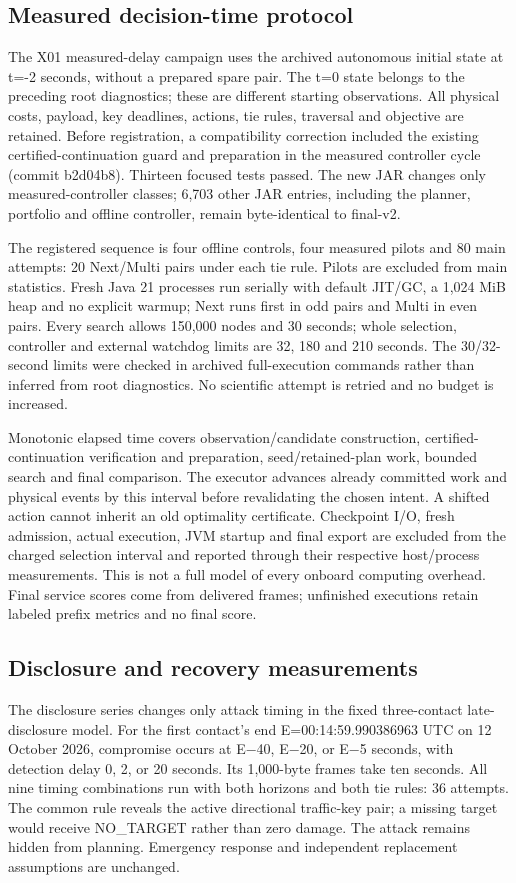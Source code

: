 \documentclass[12pt,a4paper]{article}
\begin{document}
\subsection*{Measured decision-time protocol}
The X01 measured-delay campaign uses the archived autonomous initial state at t=-2 seconds, without a prepared spare pair. The t=0 state belongs to the preceding root diagnostics; these are different starting observations. All physical costs, payload, key deadlines, actions, tie rules, traversal and objective are retained. Before registration, a compatibility correction included the existing certified-continuation guard and preparation in the measured controller cycle (commit b2d04b8). Thirteen focused tests passed. The new JAR changes only measured-controller classes; 6,703 other JAR entries, including the planner, portfolio and offline controller, remain byte-identical to final-v2.

The registered sequence is four offline controls, four measured pilots and 80 main attempts: 20 Next/Multi pairs under each tie rule. Pilots are excluded from main statistics. Fresh Java 21 processes run serially with default JIT/GC, a 1,024 MiB heap and no explicit warmup; Next runs first in odd pairs and Multi in even pairs. Every search allows 150,000 nodes and 30 seconds; whole selection, controller and external watchdog limits are 32, 180 and 210 seconds. The 30/32-second limits were checked in archived full-execution commands rather than inferred from root diagnostics. No scientific attempt is retried and no budget is increased.

Monotonic elapsed time covers observation/candidate construction, certified-continuation verification and preparation, seed/retained-plan work, bounded search and final comparison. The executor advances already committed work and physical events by this interval before revalidating the chosen intent. A shifted action cannot inherit an old optimality certificate. Checkpoint I/O, fresh admission, actual execution, JVM startup and final export are excluded from the charged selection interval and reported through their respective host/process measurements. This is not a full model of every onboard computing overhead. Final service scores come from delivered frames; unfinished executions retain labeled prefix metrics and no final score.

\subsection*{Disclosure and recovery measurements}
The disclosure series changes only attack timing in the fixed three-contact late-disclosure model. For the first contact's end E=00:14:59.990386963 UTC on 12 October 2026, compromise occurs at E$-$40, E$-$20, or E$-$5 seconds, with detection delay 0, 2, or 20 seconds. Its 1,000-byte frames take ten seconds. All nine timing combinations run with both horizons and both tie rules: 36 attempts. The common rule reveals the active directional traffic-key pair; a missing target would receive NO\_TARGET rather than zero damage. The attack remains hidden from planning. Emergency response and independent replacement assumptions are unchanged.
\end{document}
